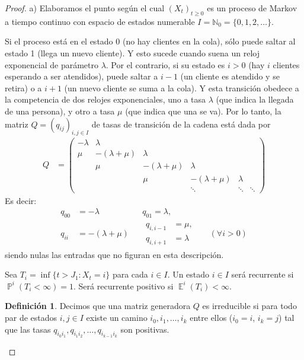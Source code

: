 \documentclass{article}
\DeclareMathOperator{\prob}{\mathbb{P}}
\DeclareMathOperator{\Exp}{\mathbb{E}}
\newcommand{\naturalnum}{\mathbb{N}}
\theoremstyle{definition}
\newtheorem{definition}{Definición}
\begin{document}
\begin{proof} a)
Elaboramos el punto según el cual \((X_t)_{t \geq 0}\) es un proceso de Markov a tiempo continuo con espacio de estados numerable \(I =  \naturalnum_0 = \{0, 1, 2, \dots\}\).

Si el proceso está en el estado 0 (no hay clientes en la cola), sólo puede saltar al estado 1 (llega un nuevo cliente). 
Y esto sucede cuando suena un reloj exponencial de parámetro \(\lambda\).
Por el contrario, si su estado es \(i > 0\) (hay \(i\) clientes esperando a ser atendidos), puede saltar a \(i - 1\) (un cliente es atendido y se retira) o a \(i + 1\) (un nuevo cliente se suma a la cola).
Y esta transición obedece a la competencia de dos relojes exponenciales, uno a tasa \(\lambda\) (que indica la llegada de una persona), y otro a tasa \(\mu\) (que indica que una se va).
Por lo tanto, la matriz \(Q = (q_{i j})_{i, j \in I}\) de tasas de transición de la cadena está dada por
\begin{align}
	Q
	&=
	\begin{pmatrix}
		- \lambda &\lambda \\
		\mu &- (\lambda + \mu) &\lambda \\
		 &\mu &- (\lambda + \mu) &\lambda \\
		 & &\mu &- (\lambda + \mu) &\lambda \\
		 & & &\ddots &\ddots &\ddots
	\end{pmatrix}
\end{align}
Es decir:
\begin{align}
	q_{0 0} &= - \lambda & &q_{0 1} = \lambda,
	\\
	q_{i i} &= - (\lambda + \mu) & &\begin{aligned}q_{i, i-1} &= \mu,\\ q_{i, i+1} &= \lambda \end{aligned} &&(\forall i > 0)
\end{align}
siendo nulas las entradas que no figuran en esta descripción.



Sea \(T_i = \inf\{t > J_1 : X_t = i\}\) para cada \(i \in I\).
Un estado \(i \in I\) será recurrente si \(\prob^i(T_i<\infty)=1\).
Será recurrente positivo si \(\Exp^i(T_i) < \infty\).

\begin{definition}
Decimos que una matriz generadora \(Q\) es irreducible si para todo par de estados \(i, j \in I\) existe un camino \(i_0, i_1, \dots, i_k\) entre ellos (\(i_0 = i\), \(i_k = j\)) tal que las tasas \(q_{i_0 i_1}, q_{i_1 i_2}, \dots, q_{i_{k - 1} i_k}\) son positivas.
\end{definition}


\end{proof}
\end{document}
